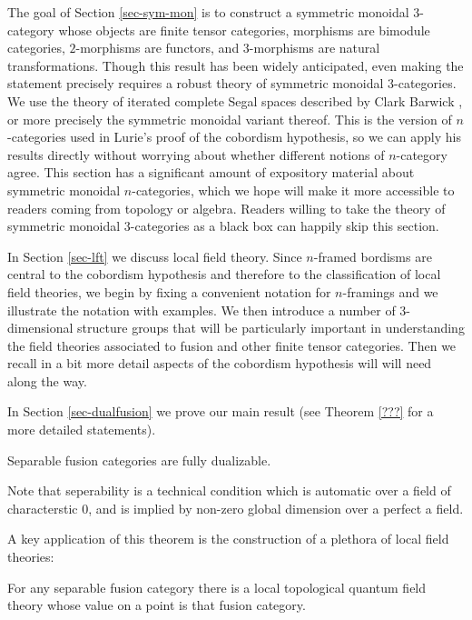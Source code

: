 \documentclass{amsart}
\begin{document}
The goal of Section \ref{sec-sym-mon} is to construct a symmetric monoidal $3$-category whose objects are finite tensor categories, morphisms are bimodule categories, $2$-morphisms are functors, and $3$-morphisms are natural transformations.  Though this result has been widely anticipated, even making the statement precisely requires a robust theory of symmetric monoidal $3$-categories.  We use the theory of iterated complete Segal spaces described by Clark Barwick \cite{???},  or more precisely the symmetric monoidal variant thereof.  This is the version of $n$-categories used in Lurie's proof of the cobordism hypothesis, so we can apply his results directly without worrying about whether different notions of $n$-category agree.  This section has a significant amount of expository material about symmetric monoidal $n$-categories, which we hope will make it more accessible to readers coming from topology or algebra.  Readers willing to take the theory of symmetric monoidal $3$-categories as a black box can happily skip this section.

In Section \ref{sec-lft} we discuss local field theory.  Since $n$-framed bordisms are central to the cobordism hypothesis and therefore to the classification of local field theories, we begin by fixing a convenient notation for $n$-framings and we illustrate the notation with examples.  We then introduce a number of $3$-dimensional structure groups that will be particularly important in understanding the field theories associated to fusion and other finite tensor categories.  Then we recall in a bit more detail aspects of the cobordism hypothesis will will need along the way.

In Section \ref{sec-dualfusion} we prove our main result (see Theorem \ref{???} for a more detailed statements).

\begin{theorem}
Separable fusion categories are fully dualizable.
\end{theorem}

\nid Note that seperability is a technical condition which is automatic over a field of characterstic $0$, and is implied by non-zero global dimension over a perfect a field.


A key application of this theorem is the construction of a plethora of local field theories:
\begin{corollary}
For any separable fusion category there is a local topological quantum field theory whose value on a point is that fusion category.  
\end{corollary}
\end{document}
